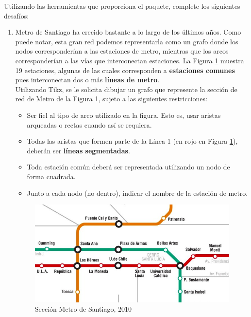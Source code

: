 \documentclass[letterpaper,10pt]{article}
\begin{document}
\vspace{0.4cm}

Utilizando las herramientas que proporciona el paquete, complete los siguientes desafíos:
\begin{enumerate}[1)]
\item Metro de Santiago ha crecido bastante a lo largo de los últimos años. Como puede notar, esta gran red podemos representarla como un grafo donde los nodos corresponderían a las estaciones de metro, mientras que los arcos corresponderían a las vías que interconectan estaciones. La Figura \ref{fig:metro} muestra 19 estaciones, algunas de las cuales corresponden a \textbf{estaciones comunes} pues interconectan dos o más \textbf{líneas de metro}. \\
Utilizando Tikz, se le solicita dibujar un grafo que represente la sección de red de Metro de la Figura \ref{fig:metro}, sujeto a las siguientes restricciones: 
\begin{itemize}
    \item Ser fiel al tipo de arco utilizado en la figura. Esto es, usar aristas arqueadas o rectas cuando así se requiera.
    \item Todas las aristas que formen parte de la Línea 1 (en rojo en Figura \ref{fig:metro}), deberán ser \textbf{líneas segmentadas}.
    \item Toda estación común deberá ser representada utilizando un nodo de forma cuadrada. 
    \item Junto a cada nodo (no dentro), indicar el nombre de la estación de metro.
\end{itemize} 

\begin{minipage}{\linewidth}
      \centering
      \begin{minipage}{0.8\linewidth}
          \begin{figure}[H]
              \includegraphics[width=0.9\linewidth]{sec_metro.jpeg}
              \caption{Sección Metro de Santiago, 2010}
              \label{fig:metro}
          \end{figure}
      \end{minipage}
  \end{minipage}


\end{enumerate}
\end{document}
